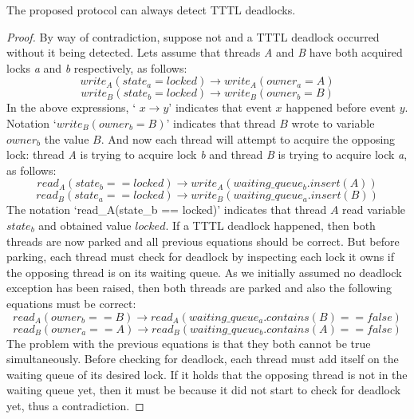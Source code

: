 \begin{lemma}
The proposed protocol can always detect TTTL deadlocks.
\end{lemma}
\begin{proof}
By way of contradiction, suppose not and a TTTL deadlock occurred without it being detected.
Lets assume that threads \emph{A} and \emph{B} have both acquired locks \emph{a} and \emph{b} respectively, as follows:
\begin{equation}
write_{A}(state_{a} = locked) \rightarrow write_{A}(owner_{a} = A)
\end{equation}
\begin{equation}
write_{B}(state_{b} = locked) \rightarrow write_{B}(owner_{b} = B)
\end{equation}
In the above expressions, ` $x \rightarrow y$' indicates that event $x$ happened before event $y$. Notation `$write_{B}(owner_{b} = B)$' indicates that thread $B$ wrote to variable $owner_{b}$ the value $B$. 
And now each thread will attempt to acquire the opposing lock: thread \emph{A} is trying to acquire lock \emph{b} and thread \emph{B} is trying to acquire lock \emph{a}, as follows:
\begin{equation}
read_{A}(state_{b} == locked) \rightarrow write_{A}(waiting\_queue_{b}.insert(A))
\end{equation}
\begin{equation}
read_{B}(state_{a} == locked) \rightarrow write_{B}(waiting\_queue_{a}.insert(B))
\end{equation}
The notation `read_{A}(state_{b} == locked)' indicates that thread $A$ read variable $state_{b}$ and obtained value $locked$.
If a TTTL deadlock happened, then both threads are now parked and all previous equations should be correct.
But before parking, each thread must check for deadlock by inspecting each lock it owns if the opposing thread is on its waiting queue.
As we initially assumed no deadlock exception has been raised, then both threads are parked and also the following equations must be correct:
\begin{equation}
read_{A}(owner_{b} == B) \rightarrow read_{A}(waiting\_queue_{a}.contains(B) == false)
\end{equation}
\begin{equation}
read_{B}(owner_{a} == A) \rightarrow read_{B}(waiting\_queue_{b}.contains(A) == false)
\end{equation}
The problem with the previous equations is that they both cannot be true simultaneously.
Before checking for deadlock, each thread must add itself on the waiting queue of its desired lock.
If it holds that the opposing thread is not in the waiting queue yet, then it must be because it did not start to check for deadlock yet, thus a contradiction.
\end{proof}

